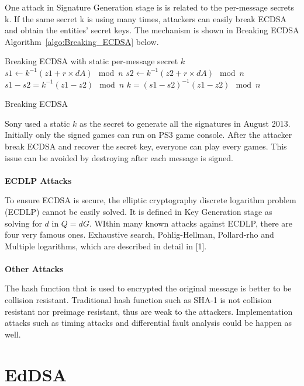 \documentclass[10pt,sigconf]{acmart}
\begin{document}
One attack in Signature Generation stage is is related to the per-message secrets k. If the same secret k is using many times, attackers can easily break ECDSA and obtain the entities' secret keys. The mechanism is shown in Breaking ECDSA Algorithm~\ref{algo:Breaking_ECDSA} below.

\begin{algorithm}
\begin{algorithmic}
\STATE Breaking ECDSA with static per-message secret $k$
\STATE $s1 \gets k^{-1}(z1 + r \times dA) \mod n$
\STATE $s2 \gets k^{-1}(z2 + r \times dA) \mod n$
\STATE $s1 - s2 = k^{-1}(z1 - z2) \mod n$
\STATE $k = (s1 - s2)^{-1} (z1 - z2) \mod n$ 
\end{algorithmic}
\caption{Breaking ECDSA}
\label{algo:Breaking_ECDSA}
\end{algorithm}

Sony used a static $k$ as the secret to generate all the signatures in August 2013. Initially only the signed games can run on PS3 game console. After the attacker break ECDSA and recover the secret key, everyone can play every games. This issue can be avoided by destroying after each message is signed.
\\
\\
\noindent \textbf{ECDLP Attacks}

To ensure ECDSA is secure, the elliptic cryptography discrete logarithm problem (ECDLP) cannot be easily solved. It is defined in Key Generation stage as solving for $d$ in $Q=dG$. WIthin many known attacks against ECDLP, there are four very famous ones. Exhaustive search, Pohlig-Hellman, Pollard-rho and Multiple logarithms, which are described in detail in [1]. 
\\
\\
\noindent \textbf{Other Attacks}

The hash function that is used to encrypted the original message is better to be collision resistant. Traditional hash function such as SHA-1 is not collision resistant nor preimage resistant, thus are weak to the attackers. Implementation attacks such as timing attacks and differential fault analysis could be happen as well.






\section{EdDSA}
\end{document}
